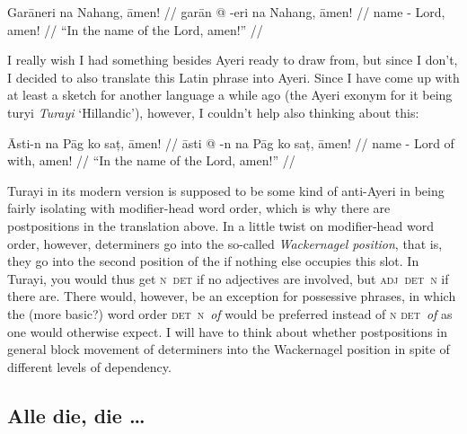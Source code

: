 \documentclass[12pt,paper=a4]{scrartcl}
\newcommand{\fw}[1]{\textit{#1}} %
\newcommand{\xayr}[3]{{\Tagati #1} \emph{#2} \enquote*{#3}}
\begin{document}

\ex \label{ex:innomine}
\begingl
	\glpreamble Garāneri na Nahang, āmen! //
	\gla garān @ -eri na Nahang, āmen! //
	\glb name -\Ins{} \Gen{} Lord, amen! //
	\glft \enquote{In the name of the Lord, amen!} //
\endgl \xe

I really wish I had something besides Ayeri ready to draw from, but 
since I don't, I decided to also translate this Latin phrase into Ayeri.
Since I have come up with at least a sketch for another language a while ago 
(the Ayeri exonym for it being \xayr{turyi}{Turayi}{Hillandic}), however, I 
couldn't help also thinking about this:

\ex[exno=\ref{ex:innomine}′] \begingl
	\glpreamble {} Āsti-n na Pāg 
		ko saț, āmen! //
	\gla āsti @ -n na Pāg ko saț, āmen! //
	\glb name -\Def{} \Def{} Lord of with, amen! //
	\glft \enquote{In the name of the Lord, amen!} //
\endgl
\xe

Turayi in its modern version is supposed to be some kind of anti-Ayeri in being 
fairly isolating with modifier-head word order, which is why there are 
postpositions in the translation above. In a little twist on modifier-head
word order, however, determiners go into the so-called \fw{Wackernagel position}, 
that is, they go into the second position of the \Np{} if nothing else occupies 
this slot. In Turayi, you would thus get \textsc{n}~\textsc{det} if no 
adjectives are involved, but \textsc{adj}~\textsc{det}~\textsc{n} if there are. 
There would, however, be an exception for possessive phrases, in which the (more 
basic?) word order \textsc{det}~\textsc{n}~\emph{of} would be preferred instead 
of \textsc{n det}~\emph{of} as one would otherwise expect. I will have to think 
about whether postpositions in general block movement of determiners into the 
Wackernagel position in spite of different levels of dependency.

\subsection*{Alle die, die …}

\end{document}
